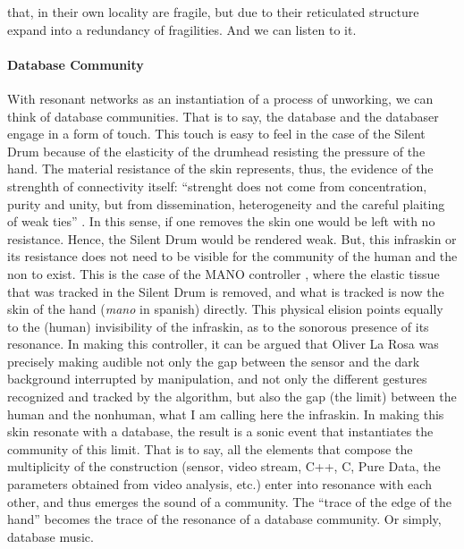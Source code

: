  that, in their own locality are fragile, but due to their reticulated structure expand into a redundancy of fragilities. And we can listen to it.

\paragraph{Database Community}
With resonant networks as an instantiation of a process of unworking, we can think of database communities. That is to say, the database and the databaser engage in a form of touch. This touch is easy to feel in the case of the Silent Drum because of the elasticity of the drumhead resisting the pressure of the hand. The material resistance of the skin represents, thus, the evidence of the strenghth of connectivity itself: ``strenght does not come from concentration, purity and unity, but from dissemination, heterogeneity and the careful plaiting of weak ties'' \parencite[3]{Lat90:On}. In this sense, if one removes the skin one would be left with no resistance. Hence, the Silent Drum would be rendered weak. But, this infraskin or its resistance does not need to be visible for the community of the human and the non to exist. This is the case of the MANO controller \parencite{DBLP:conf/icmc/OliverJ10}, where the elastic tissue that was tracked in the Silent Drum is removed, and what is tracked is now the skin of the hand (\textit{mano} in spanish) directly. This physical elision points equally to the (human) invisibility of the infraskin, as to the sonorous presence of its resonance. In making this controller, it can be argued that Oliver La Rosa was precisely making audible not only the gap between the sensor and the dark background interrupted by manipulation, and not only the different gestures recognized and tracked by the algorithm, but also the gap (the limit) between the human and the nonhuman, what I am calling here the infraskin. In making this skin resonate with a database, the result is a sonic event that instantiates the community of this limit. That is to say, all the elements that compose the multiplicity of the construction (sensor, video stream, C++, C, Pure Data, the parameters obtained from video analysis, etc.) enter into resonance with each other, and thus emerges the sound of a community. The ``trace of the edge of the hand'' becomes the trace of the resonance of a database community. Or simply, database music.

